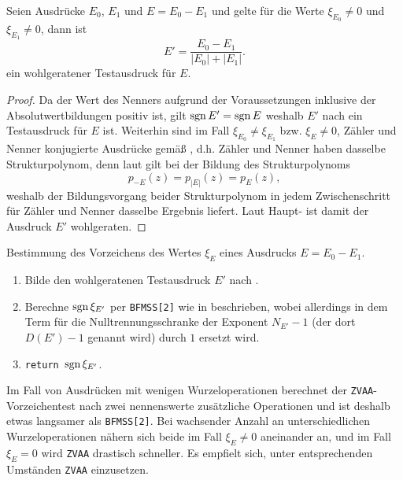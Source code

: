 \begin{theorem}\label{th:Ein wohlgeratener Testausdruck}
Seien Ausdrücke $E_0$, $E_1$ und $E=E_0-E_1$
und gelte für die Werte $\xi_{E_0}\ne 0$ und $\xi_{E_1}\ne 0$,
dann ist 
\begin{equation*}
  E' = \frac{E_0-E_1}{|E_0|+|E_1|}.
\end{equation*}
ein wohlgeratener Testausdruck für $E$.
\begin{proof}
Da der Wert des Nenners
aufgrund der Voraussetzungen inklusive der Absolutwertbildungen
positiv ist, gilt $\operatorname{sgn} E'=\operatorname{sgn} E$ 
weshalb $E'$ nach 
ein Testausdruck für $E$ ist.
Weiterhin sind im Fall $\xi_{E_0}\ne\xi_{E_1}$
bzw. $\xi_E\ne 0$, Zähler und Nenner 
konjugierte Ausdrücke gemäß ,
d.h. Zähler und Nenner haben dasselbe Strukturpolynom,
denn laut 
gilt bei der Bildung des Strukturpolynoms 
\begin{equation*}
p_{-E}(z) = p_{|E|}(z) = p_E(z),
\end{equation*}
weshalb der Bildungsvorgang beider Strukturpolynom 
in jedem Zwischenschritt für Zähler und Nenner 
dasselbe Ergebnis liefert.
Laut Haupt-
ist damit der Ausdruck $E'$ wohlgeraten.
\end{proof}
\end{theorem}

\pagebreak
\begin{algorithm}\label{al:Vorzeichentest}
Bestimmung des Vorzeichens des Wertes $\xi_E$ 
eines Ausdrucks $E=E_0-E_1$.
\begin{enumerate}
\item Bilde den wohlgeratenen Testausdruck $E'$
      nach .
\item Berechne $\operatorname{sgn}\xi_{E'}$
      per {\tt BFMSS[2]} wie in \cite{BFMSS, PIYAP} beschrieben,
	  wobei allerdings in dem Term für die Nulltrennungsschranke
	  der Exponent $N_{E'}-1$ (der dort $D(E')-1$ genannt wird)
	  durch $1$ ersetzt wird.
\item {\tt return $\operatorname{sgn}\xi_{E'}$}.
\end{enumerate}
\end{algorithm}


\begin{remark}
Im Fall von Ausdrücken
mit wenigen Wurzeloperationen 
berechnet der {\tt ZVAA}-Vorzeichentest
nach 
zwei nennenswerte zusätzliche Operationen
und ist deshalb etwas langsamer als {\tt BFMSS[2]}.
Bei wachsender Anzahl an unterschiedlichen Wurzeloperationen 
nähern sich beide im Fall $\xi_E\ne 0$ aneinander an,
und im Fall $\xi_E=0$ wird {\tt ZVAA} drastisch schneller.
Es empfielt sich, unter entsprechenden Umständen {\tt ZVAA} einzusetzen.
\end{remark}
